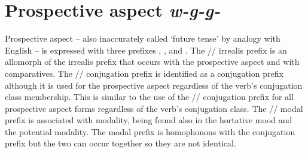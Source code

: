 \documentclass[12pt,letterpaper,landscape,oneside,article]{memoir}
\begin{document}
\section{Prospective aspect \textit{w-g-g̱-}}

Prospective aspect – also inaccurately called ‘future tense’ by analogy with English – is expressed with three prefixes , , and .
The  // irrealis prefix is an allomorph of the irrealis prefix that occurs with the prospective aspect and with comparatives.
The  // conjugation prefix is identified as a conjugation prefix although it is used for the prospective aspect regardless of the verb’s conjugation class membership.
This is similar to the use of the  // conjugation prefix for all prospective aspect forms regardless of the verb’s conjugation class.
The  // modal prefix is associated with modality, being found also in the hortative mood and the potential modality.
The  modal prefix is homophonous with the  conjugation prefix but the two can occur together so they are not identical.
\end{document}
